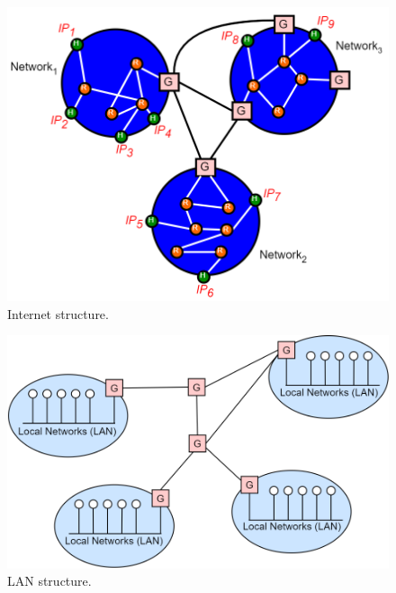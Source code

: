 \begin{figure}[h]
\centering
\includegraphics[scale=0.4]{Images/IP/net_structure}
\caption{\footnotesize{Internet structure.}}\label{net_structure}
\end{figure}
\begin{figure}[h]
\centering
\includegraphics[scale=0.4]{Images/IP/lan}
\caption{\footnotesize{LAN structure.}}\label{lan}
\end{figure}
\clearpage
